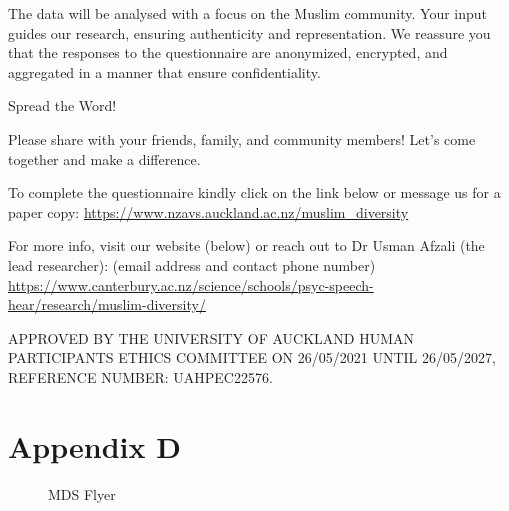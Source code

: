 \documentclass[
]{interact}
\begin{document}
\noindent The data will be analysed with a focus on the Muslim
community. Your input guides our research, ensuring authenticity and
representation. We reassure you that the responses to the questionnaire
are anonymized, encrypted, and aggregated in a manner that ensure
confidentiality.

\noindent Spread the Word!

\noindent Please share with your friends, family, and community members!
Let's come together and make a difference.

\noindent To complete the questionnaire kindly click on the link below
or message us for a paper copy:
\url{https://www.nzavs.auckland.ac.nz/muslim_diversity}

\noindent For more info, visit our website (below) or reach out to Dr
Usman Afzali (the lead researcher): (email address and contact phone
number)
\url{https://www.canterbury.ac.nz/science/schools/psyc-speech-hear/research/muslim-diversity/}

\noindent APPROVED BY THE UNIVERSITY OF AUCKLAND HUMAN PARTICIPANTS
ETHICS COMMITTEE ON 26/05/2021 UNTIL 26/05/2027, REFERENCE NUMBER:
UAHPEC22576.

\newpage{}

\section{Appendix D}\label{appendix-d}

\begin{figure}


\caption{\label{fig-appendfig}MDS Flyer}

\end{figure}%
\end{document}

